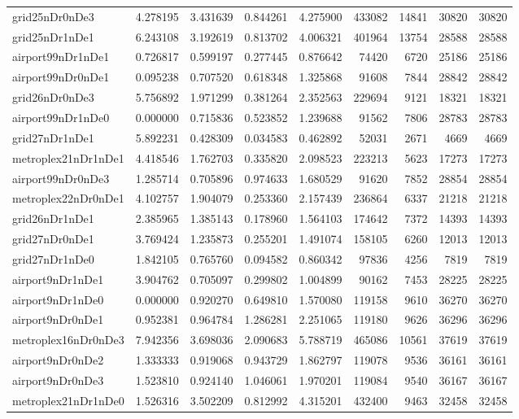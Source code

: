 \documentclass[../../../thesis.tex]{subfiles}
\begin{document}
\begin{longtable}{|l|r|r|r|r|r|r|r|r|}
grid25nDr0nDe3 & 4.278195 & 3.431639 & 0.844261 & 4.275900 & 433082 & 14841 & 30820 & 30820 \\
grid25nDr1nDe1 & 6.243108 & 3.192619 & 0.813702 & 4.006321 & 401964 & 13754 & 28588 & 28588 \\
airport99nDr1nDe1 & 0.726817 & 0.599197 & 0.277445 & 0.876642 & 74420 & 6720 & 25186 & 25186 \\
airport99nDr0nDe1 & 0.095238 & 0.707520 & 0.618348 & 1.325868 & 91608 & 7844 & 28842 & 28842 \\
grid26nDr0nDe3 & 5.756892 & 1.971299 & 0.381264 & 2.352563 & 229694 & 9121 & 18321 & 18321 \\
airport99nDr1nDe0 & 0.000000 & 0.715836 & 0.523852 & 1.239688 & 91562 & 7806 & 28783 & 28783 \\
grid27nDr1nDe1 & 5.892231 & 0.428309 & 0.034583 & 0.462892 & 52031 & 2671 & 4669 & 4669 \\
metroplex21nDr1nDe1 & 4.418546 & 1.762703 & 0.335820 & 2.098523 & 223213 & 5623 & 17273 & 17273 \\
airport99nDr0nDe3 & 1.285714 & 0.705896 & 0.974633 & 1.680529 & 91620 & 7852 & 28854 & 28854 \\
metroplex22nDr0nDe1 & 4.102757 & 1.904079 & 0.253360 & 2.157439 & 236864 & 6337 & 21218 & 21218 \\
grid26nDr1nDe1 & 2.385965 & 1.385143 & 0.178960 & 1.564103 & 174642 & 7372 & 14393 & 14393 \\
grid27nDr0nDe1 & 3.769424 & 1.235873 & 0.255201 & 1.491074 & 158105 & 6260 & 12013 & 12013 \\
grid27nDr1nDe0 & 1.842105 & 0.765760 & 0.094582 & 0.860342 & 97836 & 4256 & 7819 & 7819 \\
airport9nDr1nDe1 & 3.904762 & 0.705097 & 0.299802 & 1.004899 & 90162 & 7453 & 28225 & 28225 \\
airport9nDr1nDe0 & 0.000000 & 0.920270 & 0.649810 & 1.570080 & 119158 & 9610 & 36270 & 36270 \\
airport9nDr0nDe1 & 0.952381 & 0.964784 & 1.286281 & 2.251065 & 119180 & 9626 & 36296 & 36296 \\
metroplex16nDr0nDe3 & 7.942356 & 3.698036 & 2.090683 & 5.788719 & 465086 & 10561 & 37619 & 37619 \\
airport9nDr0nDe2 & 1.333333 & 0.919068 & 0.943729 & 1.862797 & 119078 & 9536 & 36161 & 36161 \\
airport9nDr0nDe3 & 1.523810 & 0.924140 & 1.046061 & 1.970201 & 119084 & 9540 & 36167 & 36167 \\
metroplex21nDr1nDe0 & 1.526316 & 3.502209 & 0.812992 & 4.315201 & 432400 & 9463 & 32458 & 32458 \\

\end{longtable}
\end{document}
